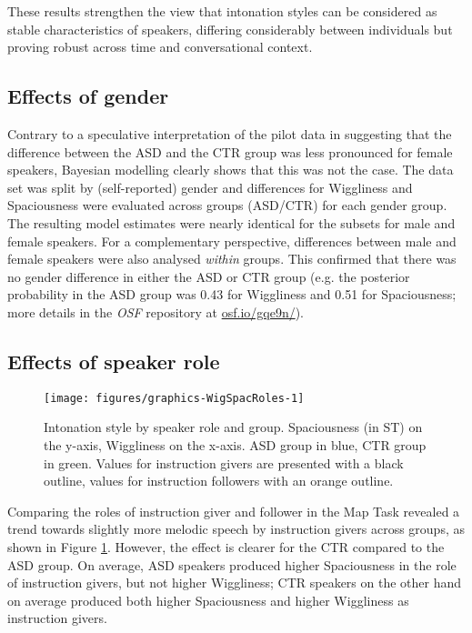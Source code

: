 These results strengthen the view that intonation styles can be considered as stable characteristics of speakers, differing considerably between individuals but proving robust across time and conversational context.

	\subsection{Effects of gender}\label{int_results_gender}

Contrary to a speculative interpretation of the pilot data in \citet{wehrleAssessingIntonationStyle2020} suggesting that the difference between the ASD and the CTR group was less pronounced for female speakers, Bayesian modelling clearly shows that this was not the case. The data set was split by (self-reported) gender and differences for Wiggliness and Spaciousness were evaluated across groups (ASD/CTR) for each gender group. The resulting model estimates were nearly identical for the subsets for male and female speakers. For a complementary perspective, differences between male and female speakers were also analysed \emph{within} groups. This confirmed that there was no gender difference in either the ASD or CTR group (e.g. the posterior probability in the ASD group was 0.43 for Wiggliness and 0.51 for Spaciousness; more details in the \textit{OSF} repository at  \url{osf.io/gqe9n/}).


	\subsection{Effects of speaker role}\label{int_results_role}



\begin{figure}
	
	{\texttt{[image: figures/graphics-WigSpacRoles-1]}
		
	}
	
	\caption{Intonation style by speaker role and group. Spaciousness (in ST) on the y-axis, Wiggliness on the x-axis. ASD group in blue, CTR group in green. Values for instruction givers are presented with a black outline, values for instruction followers with an orange outline.}\label{fig:WigSpacRoles}
\end{figure}

Comparing the roles of instruction giver and follower in the Map Task revealed a trend towards slightly more melodic speech by instruction givers across groups, as shown in Figure \ref{fig:WigSpacRoles}. However, the effect is clearer for the CTR compared to the ASD group. On average, ASD speakers produced higher Spaciousness in the role of instruction givers, but not higher Wiggliness; CTR speakers on the other hand on average produced both higher Spaciousness and higher Wiggliness as instruction givers.

